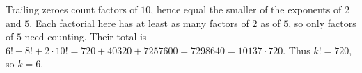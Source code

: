Trailing zeroes count factors of $10$, hence equal the smaller of the exponents of $2$ and $5$. Each factorial here has at least as many factors of $2$ as of $5$, so only factors of $5$ need counting. Their total is $6!+8!+2\cdot10!=720+40320+7257600=7298640=10137\cdot720$. Thus $k!=720$, so $\boxed{k=6}$.
